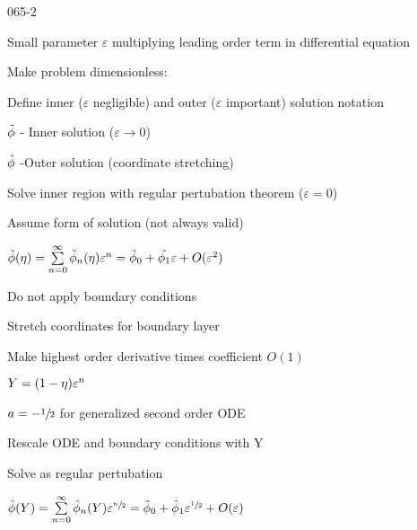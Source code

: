 \begin{mitframe}{065-2}
\begin{listone}
	\item Small parameter $\varepsilon$  multiplying leading order term in differential equation
    \item Make problem dimensionless:
    \item Define inner ($\varepsilon$  negligible) and outer ($\varepsilon$ important) solution notation
    	\begin{listtwo}
          \item $\tilde{\eleccoeff}$ - Inner solution ($\varepsilon\rightarrow{0}$)
          \item $\hat{\eleccoeff}$ -Outer solution (coordinate stretching)
        \end{listtwo}
    \item Solve inner region with regular pertubation theorem ($\varepsilon=0$)
    	\begin{listtwo}
        	\item Assume form of solution (not always valid)
            		\begin{listthree}
                    	\item $\tilde{\eleccoeff}(\intrinsvisc)=\sum\limits_{n=0}^{\infty}\tilde{\eleccoeff}_n(\intrinsvisc)\varepsilon^n=\tilde{\eleccoeff}_{\init}+\tilde{\eleccoeff_1}\varepsilon+O(\varepsilon^2)$
                    \end{listthree}
            \item Do not apply boundary conditions
        \end{listtwo}
    \item  Stretch coordinates for boundary layer
    		\begin{listtwo}
            	\item Make highest order derivative times coefficient $O(1)$
                \item $Y=(1-\intrinsvisc)\varepsilon^{n}$
                \item $\activity=-\sfrac{1}{2}$ for generalized second order ODE
                \item Rescale ODE and boundary conditions with Y
                \item Solve as regular pertubation
                	\begin{listthree}
                    	\item $\hat{\eleccoeff}(Y)=\sum\limits_{n=0}^{\infty}\hat{\eleccoeff}_n(Y)\varepsilon^{\sfrac{n}{2}}=\hat{\eleccoeff}_{\init}+\hat{\eleccoeff}_1\varepsilon^{\sfrac{1}{2}}+O(\varepsilon)$

\end{listthree}
\end{listtwo}
\end{listone}
\end{mitframe}
